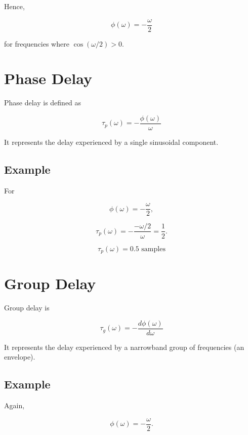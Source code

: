 Hence,

\[
\boxed{
\phi(\omega)=-\frac{\omega}{2}
}
\]

for frequencies where \(\cos(\omega/2) > 0\).


\section{Phase Delay}

Phase delay is defined as

\[
\boxed{
\tau_p(\omega)=
-\frac{\phi(\omega)}{\omega}
}
\]

It represents the delay experienced by a single sinusoidal component.


\subsection{Example}

For

\[
\phi(\omega)=-\frac{\omega}{2},
\]

\[
\tau_p(\omega)=
-\frac{-\omega/2}{\omega}
=
\frac12.
\]

\[
\boxed{
\tau_p(\omega)=0.5\text{ samples}
}
\]


\section{Group Delay}

Group delay is

\[
\boxed{
\tau_g(\omega)=
-\frac{d\phi(\omega)}{d\omega}
}
\]

It represents the delay experienced by a narrowband group of frequencies (an
envelope).


\subsection{Example}

Again,

\[
\phi(\omega)=-\frac{\omega}{2}.
\]

